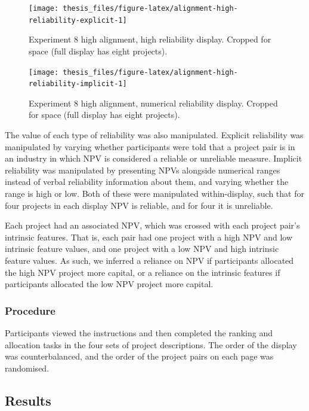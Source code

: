 \documentclass[a4paper, nobind, dvipsnames]{templates/ociamthesis}
\theoremstyle{definition}
\theoremstyle{definition}
\theoremstyle{definition}
\theoremstyle{definition}
\theoremstyle{remark}
\begin{document}
\begin{figure}
\texttt{[image: thesis\_files/figure-latex/alignment-high-reliability-explicit-1]} \caption{Experiment 8 high alignment, high reliability display. Cropped for space (full display has eight projects).}\label{fig:alignment-high-reliability-explicit}
\end{figure}

\begin{figure}
\texttt{[image: thesis\_files/figure-latex/alignment-high-reliability-implicit-1]} \caption{Experiment 8 high alignment, numerical reliability display. Cropped for space (full display has eight projects).}\label{fig:alignment-high-reliability-implicit}
\end{figure}

The value of each type of reliability was also manipulated. Explicit reliability
was manipulated by varying whether participants were told that a project pair is
in an industry in which NPV is considered a reliable or unreliable measure.
Implicit reliability was manipulated by presenting NPVs alongside numerical
ranges instead of verbal reliability information about them, and varying
whether the range is high or low. Both of these were manipulated within-display,
such that for four projects in each display NPV is reliable, and for four it is
unreliable.

Each project had an associated NPV, which was crossed with each project pair's
intrinsic features. That is, each pair had one project with a high NPV and low
intrinsic feature values, and one project with a low NPV and high intrinsic
feature values. As such, we inferred a reliance on NPV if participants allocated
the high NPV project more capital, or a reliance on the intrinsic features if
participants allocated the low NPV project more capital.

\subsubsection{Procedure}

Participants viewed the instructions and then completed the ranking and
allocation tasks in the four sets of project descriptions. The order of the
display was counterbalanced, and the order of the project pairs on each page was
randomised.

\subsection{Results}
\end{document}
